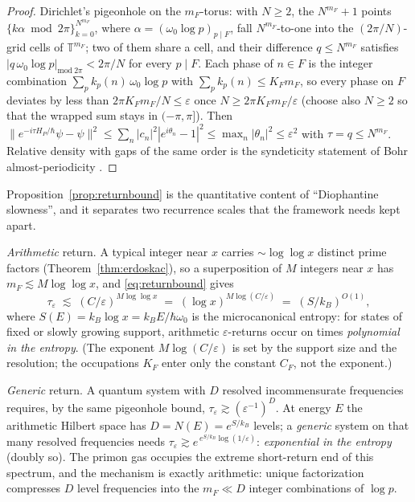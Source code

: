 \documentclass[11pt,a4paper]{article}
\theoremstyle{plain}
\theoremstyle{definition}
\theoremstyle{remark}
\begin{document}
\begin{proof}
Dirichlet's pigeonhole on the $m_{F}$-torus: with $N\geq2$, the $N^{m_{F}}+1$ points
$\{k\alpha\bmod 2\pi\}_{k=0}^{N^{m_{F}}}$, where
$\alpha=(\omega_{0}\log p)_{p\mid F}$, fall $N^{m_{F}}$-to-one into the $(2\pi/N)$-grid cells
of $\mathbb{T}^{m_{F}}$; two of them share a cell, and their difference $q\leq N^{m_{F}}$
satisfies $|q\,\omega_{0}\log p|_{\mathrm{mod}\ 2\pi}<2\pi/N$ for every $p\mid F$. Each phase of
$n\in F$ is the integer combination $\sum_{p}k_{p}(n)\,\omega_{0}\log p$ with
$\sum_{p}k_{p}(n)\leq K_{F}m_{F}$, so every phase on $F$ deviates by less than
$2\pi K_{F}m_{F}/N\leq\varepsilon$ once $N\geq2\pi K_{F}m_{F}/\varepsilon$ (choose also
$N\geq2$ so that the wrapped sum stays in $(-\pi,\pi]$). Then
$\|e^{-i\tau H_{P}/\hbar}\psi-\psi\|^{2}\leq\sum_{n}|c_{n}|^{2}|e^{i\theta_{n}}-1|^{2}
\leq\max_{n}|\theta_{n}|^{2}\leq\varepsilon^{2}$ with $\tau=q\leq N^{m_{F}}$. Relative
density with gaps of the same order is the syndeticity statement of Bohr almost-periodicity
\cite{besicovitch1932}.
\end{proof}

Proposition~\ref{prop:returnbound} is the quantitative content of ``Diophantine slowness'',
and it separates two recurrence scales that the framework needs kept apart.

\emph{Arithmetic} return. A typical integer near $x$ carries $\sim\log\log x$ distinct prime
factors (Theorem~\ref{thm:erdoskac}), so a superposition of $M$ integers near $x$ has
$m_{F}\lesssim M\log\log x$, and \eqref{eq:returnbound} gives
\begin{equation}\label{eq:arithreturn}
\tau_{\varepsilon}\;\lesssim\;(C/\varepsilon)^{M\log\log x}
\;=\;(\log x)^{M\log(C/\varepsilon)}
\;=\;(S/k_{B})^{O(1)},
\end{equation}
where $S(E)=k_{B}\log x=k_{B}E/\hbar\omega_{0}$ is the microcanonical entropy: for states
of fixed or slowly growing support, arithmetic $\varepsilon$-returns occur on times
\emph{polynomial in the entropy}. (The exponent $M\log(C/\varepsilon)$ is set by the support
size and the resolution; the occupations $K_{F}$ enter only the constant $C_{F}$, not the
exponent.)

\emph{Generic} return. A quantum system with $D$ resolved incommensurate frequencies
requires, by the same pigeonhole bound, $\tau_{\varepsilon}\gtrsim(\varepsilon^{-1})^{D}$. At
energy $E$ the arithmetic Hilbert space has $D=N(E)=e^{S/k_{B}}$ levels; a \emph{generic}
system on that many resolved frequencies needs
$\tau_{\varepsilon}\gtrsim e^{\,e^{S/k_{B}}\log(1/\varepsilon)}$: \emph{exponential in the
entropy} (doubly so). The primon gas occupies the extreme short-return end of this spectrum,
and the mechanism is exactly arithmetic: unique factorization compresses $D$ level
frequencies into the $m_{F}\ll D$ integer combinations of $\log p$.
\end{document}
